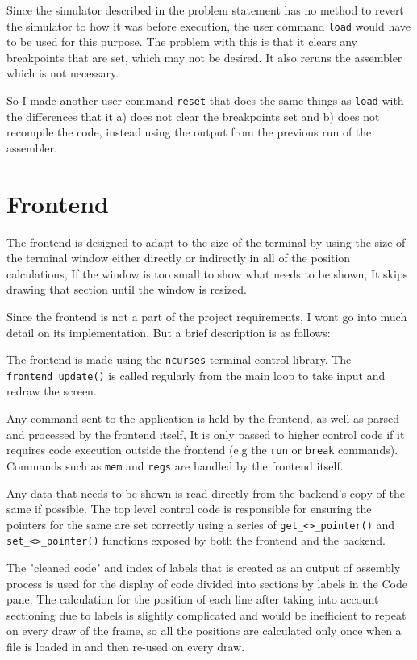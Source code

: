 \documentclass[12pt]{article}
\begin{document}
	Since the simulator described in the problem statement has no method to revert the simulator to how it was before execution, the user command \verb|load| would have to be used for this purpose. The problem with this is that it clears any breakpoints that are set, which may not be desired. It also reruns the assembler which is not necessary.

	So I made another user command \verb|reset| that does the same things as \verb|load| with the differences that it a) does not clear the breakpoints set and b) does not recompile the code, instead using the output from the previous run of the assembler.

	\section{Frontend}

	The frontend is designed to adapt to the size of the terminal by using the size of the terminal window either directly or indirectly in all of the position calculations, If the window is too small to show what needs to be shown, It skips drawing that section until the window is resized.

	Since the frontend is not a part of the project requirements, I wont go into much detail on its implementation, But a brief description is as follows:

	The frontend is made using the \verb|ncurses| terminal control library. The \verb|frontend_update()| is called regularly from the main loop to take input and redraw the screen.

	Any command sent to the application is held by the frontend, as well as parsed and processed by the frontend itself, It is only passed to higher control code if it requires code execution outside the frontend (e.g the \verb|run| or \verb|break| commands). Commands such as \verb|mem| and \verb|regs| are handled by the frontend itself.

	Any data that needs to be shown is read directly from the backend's copy of the same if possible. The top level control code is responsible for ensuring the pointers for the same are set correctly using a series of \verb|get_<>_pointer()| and \verb|set_<>_pointer()| functions exposed by both the frontend and the backend.

	The "cleaned code" and index of labels that is created as an output of assembly process is used for the display of code divided into sections by labels in the Code pane. The calculation for the position of each line after taking into account sectioning due to labels is slightly complicated and would be inefficient to repeat on every draw of the frame, so all the positions are calculated only once when a file is loaded in and then re-used on every draw.
\end{document}
